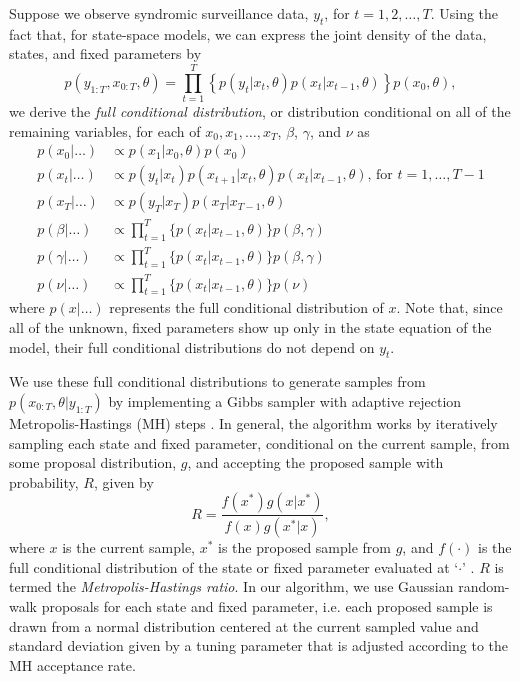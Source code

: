 Suppose we observe syndromic surveillance data, $y_t$, for $t = 1, 2, \ldots, T$. Using the fact that, for state-space models, we can express the joint density of the data, states, and fixed parameters by
\begin{equation}
p(y_{1:T},x_{0:T},\theta) = \prod_{t = 1}^T \left\{p(y_t|x_t,\theta)p(x_t|x_{t-1},\theta)\right\}p(x_0,\theta), \label{eqn:joint}
\end{equation}
we derive the \emph{full conditional distribution}, or distribution conditional on all of the remaining variables, for each of $x_0, x_1, \ldots, x_T$, $\beta$, $\gamma$, and $\nu$ as
\begin{align}
p(x_0|\hdots) &\propto p(x_1|x_0,\theta)p(x_0) \label{eqn:epid:fullcond} \\
p(x_t|\hdots) &\propto p(y_t|x_t)p(x_{t+1}|x_t,\theta)p(x_t|x_{t-1},\theta) \mbox{, for } t = 1,\ldots,T-1 \nonumber \\
p(x_T|\hdots) &\propto p(y_T|x_T)p(x_T|x_{T-1},\theta) \nonumber \\
p(\beta|\hdots) &\propto \prod_{t=1}^T \{p(x_t|x_{t-1},\theta)\}p(\beta, \gamma) \nonumber \\
p(\gamma|\hdots) &\propto \prod_{t=1}^T \{p(x_t|x_{t-1},\theta)\}p(\beta, \gamma) \nonumber \\
p(\nu|\hdots) &\propto \prod_{t=1}^T \{p(x_t|x_{t-1},\theta)\}p(\nu) \nonumber
\end{align}
where $p(x|\hdots)$ represents the full conditional distribution of $x$. Note that, since all of the unknown, fixed parameters show up only in the state equation of the model, their full conditional distributions do not depend on $y_t$.

We use these full conditional distributions to generate samples from $p(x_{0:T},\theta|y_{1:T})$ by implementing a Gibbs sampler with adaptive rejection Metropolis-Hastings (MH) steps \citep{Metr:Rose:Rose:Tell:Tell:equa:1953, Hast:mont:1970,  Gema:Gema:stoc:1984, gilks1995adaptive}. In general, the algorithm works by iteratively sampling each state and fixed parameter, conditional on the current sample, from some proposal distribution, $g$, and accepting the proposed sample with probability, $R$, given by
\begin{equation}
R = \frac{f(x^*)g(x|x^*)}{f(x)g(x^*|x)}, \label{eqn:mhrat}
\end{equation}
where $x$ is the current sample, $x^*$ is the proposed sample from $g$, and $f(\cdot)$ is the full conditional distribution of the state or fixed parameter evaluated at `$\cdot$' \cite[Chap 7][]{giv:hoet:2005:comp}. $R$ is termed the \emph{Metropolis-Hastings ratio}. In our algorithm, we use Gaussian random-walk proposals for each state and fixed parameter, i.e. each proposed sample is drawn from a normal distribution centered at the current sampled value and standard deviation given by a tuning parameter that is adjusted according to the MH acceptance rate.

